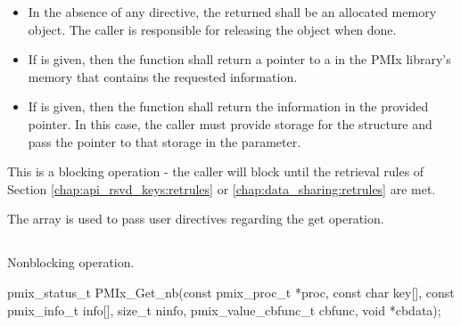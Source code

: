 \begin{itemize}
    \item In the absence of any directive, the returned  shall be an allocated memory object. The caller is responsible for releasing the object when done.
    \item If  is given, then the function shall return a pointer to a  in the \ac{PMIx} library's memory that contains the requested information.
    \item If  is given, then the function shall return the information in the provided  pointer. In this case, the caller must provide storage for the structure and pass the pointer to that storage in the  parameter.
\end{itemize}

This is a blocking operation - the caller will block until the retrieval rules of Section \ref{chap:api_rsvd_keys:retrules} or \ref{chap:data_sharing:retrules} are met.

The  array is used to pass user directives regarding the get operation.

\subsection{}

\summary

Nonblocking  operation.

\format

\cspecificstart
\begin{codepar}
pmix_status_t
PMIx_Get_nb(const pmix_proc_t *proc, const char key[],
            const pmix_info_t info[], size_t ninfo,
            pmix_value_cbfunc_t cbfunc, void *cbdata);
\end{codepar}
\cspecificend

\begin{arglist}
\end{arglist}


